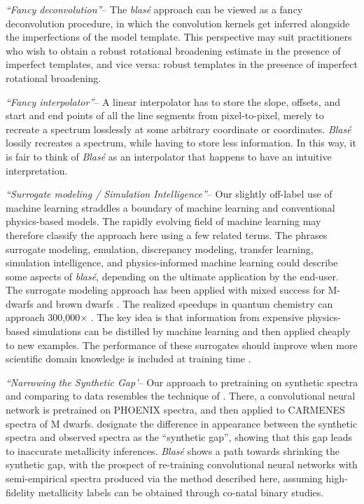 \documentclass[twocolumn]{aastex631}
\begin{document}
\emph{``Fancy deconvolution''}-- The  \emph{blas\'e} approach can be viewed as a fancy deconvolution procedure, in which the convolution kernels get inferred alongside the imperfections of the model template.  This perspective may suit practitioners who wish to obtain a robust rotational broadening estimate in the presence of imperfect templates, and vice versa: robust templates in the presence of imperfect rotational broadening.

\emph{``Fancy interpolator''}--  A linear interpolator has to store the slope, offsets, and start and end points of all the line segments from pixel-to-pixel, merely to recreate a spectrum losslessly at some arbitrary coordinate or coordinates.  \emph{Blas\'e} lossily recreates a spectrum, while having to store less information.  In this way, it is fair to think of \emph{Blas\'e} as an interpolator that happens to have an intuitive interpretation.

\emph{``Surrogate modeling / Simulation Intelligence''}-- Our slightly off-label use of machine learning straddles a boundary of machine learning and conventional physics-based models.  The rapidly evolving field of machine learning may therefore classify the approach here using a few related terms.  The phrases surrogate modeling, emulation, discrepancy modeling, transfer learning, simulation intelligence, and physics-informed machine learning could describe some aspects of \emph{blas\'e}, depending on the ultimate application by the end-user.  The surrogate modeling approach has been applied with mixed success for M-dwarfs \citep{2020A&A...642A..22P} and brown dwarfs \citep{2020PASP..132d4502J}.  The realized speedups in quantum chemistry can approach 300,000$\times$ \citep{pmlr-v70-gilmer17a}. The key idea is that information from expensive physics-based simulations can be distilled by machine learning and then applied cheaply to new examples.  The performance of these surrogates should improve when more scientific domain knowledge is included at training time \citep{2018ApJ...869L...7A}.

\emph{``Narrowing the Synthetic Gap'}-- Our approach to pretraining on synthetic spectra and comparing to data resembles the technique of \citet{2020A&A...642A..22P}. There, a convolutional neural network is pretrained on PHOENIX spectra, and then applied to CARMENES spectra of M dwarfs.  \citet{2020A&A...642A..22P} designate the difference in appearance between the synthetic spectra and observed spectra as the ``synthetic gap'', showing that this gap leads to inaccurate metallicity inferences.  \emph{Blas\'e} shows a path towards shrinking the synthetic gap, with the prospect of re-training convolutional neural networks with semi-empirical spectra produced via the method described here, assuming high-fidelity metallicity labels can be obtained through co-natal binary studies.
\end{document}
